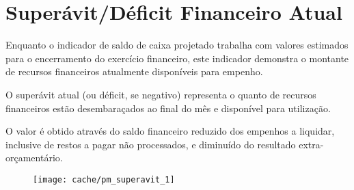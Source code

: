 
\section[Superávit/Déficit Financeiro Atual]{Superávit/Déficit Financeiro Atual}

Enquanto o indicador de saldo de caixa projetado trabalha com valores estimados para o encerramento do exercício financeiro, este indicador demonstra o montante de recursos financeiros atualmente disponíveis para empenho.

O superávit atual (ou déficit, se negativo) representa o quanto de recursos financeiros estão desembaraçados ao final do mês e disponível para utilização.

O valor é obtido através do saldo financeiro reduzido dos empenhos a liquidar, inclusive de restos a pagar não processados, e diminuído do resultado extra-orçamentário.




\begin{figure}[H]
\center
\texttt{[image: cache/pm\_superavit\_1]}
\end{figure}
